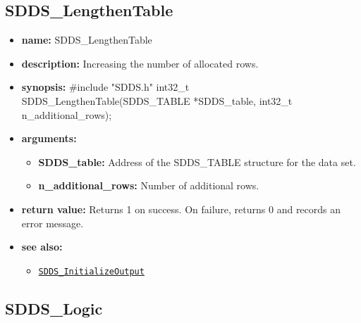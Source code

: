 \documentclass[11pt]{article}
\newcommand{\progref}[1]{\hyperref[SDDS_#1]{\tt SDDS\_#1}}
\begin{document}
\subsection{SDDS\_LengthenTable}
\label{SDDS_LengthenTable}

\begin{itemize}
\item {\bf name:}\newline
SDDS\_LengthenTable
\item {\bf description:}\newline
Increasing the number of allocated rows. 
\item {\bf synopsis:} \#include "SDDS.h"\newline
int32\_t SDDS\_LengthenTable(SDDS\_TABLE *SDDS\_table, int32\_t n\_additional\_rows);
\item {\bf arguments:}
\begin{itemize}
\item {\bf SDDS\_table:} Address of the SDDS\_TABLE structure for the data set.
\item {\bf n\_additional\_rows:} Number of additional rows.
\end{itemize}
\item {\bf return value:}\newline
Returns 1 on success. On failure, returns 0 and records an error message.
\item {\bf see also:}
\begin{itemize}
\item \progref{InitializeOutput}
\end{itemize}
\end{itemize}

\subsection{SDDS\_Logic}
\label{SDDS_Logic}
\end{document}
